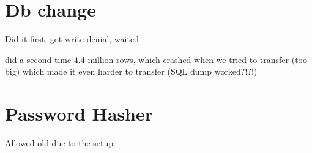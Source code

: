 \documentclass[main.tex]{subfiles}
\begin{document}
    \section{Db change}
        Did it first, got write denial, waited 
        
        did a second time 4.4 million rows, which crashed when we tried to transfer (too big) which made it even harder to transfer (SQL dump worked?!?!)

    \section{Password Hasher}
        Allowed old due to the setup
\end{document}
